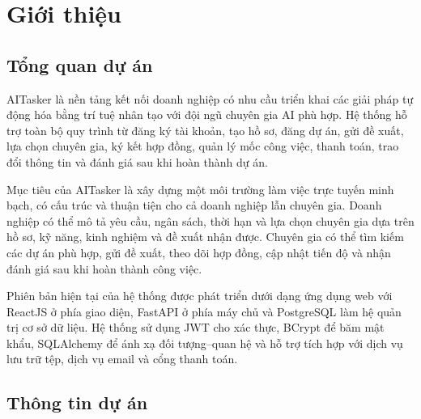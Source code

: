 
\chapter{Giới thiệu}
\label{chap:introduction}

\section{Tổng quan dự án}
\label{sec:project-overview}

AITasker là nền tảng kết nối doanh nghiệp có nhu cầu triển khai các giải pháp tự động hóa bằng trí tuệ nhân tạo với đội ngũ chuyên gia AI phù hợp. Hệ thống hỗ trợ toàn bộ quy trình từ đăng ký tài khoản, tạo hồ sơ, đăng dự án, gửi đề xuất, lựa chọn chuyên gia, ký kết hợp đồng, quản lý mốc công việc, thanh toán, trao đổi thông tin và đánh giá sau khi hoàn thành dự án.

Mục tiêu của AITasker là xây dựng một môi trường làm việc trực tuyến minh bạch, có cấu trúc và thuận tiện cho cả doanh nghiệp lẫn chuyên gia. Doanh nghiệp có thể mô tả yêu cầu, ngân sách, thời hạn và lựa chọn chuyên gia dựa trên hồ sơ, kỹ năng, kinh nghiệm và đề xuất nhận được. Chuyên gia có thể tìm kiếm các dự án phù hợp, gửi đề xuất, theo dõi hợp đồng, cập nhật tiến độ và nhận đánh giá sau khi hoàn thành công việc.

Phiên bản hiện tại của hệ thống được phát triển dưới dạng ứng dụng web với ReactJS ở phía giao diện, FastAPI ở phía máy chủ và PostgreSQL làm hệ quản trị cơ sở dữ liệu. Hệ thống sử dụng JWT cho xác thực, BCrypt để băm mật khẩu, SQLAlchemy để ánh xạ đối tượng--quan hệ và hỗ trợ tích hợp với dịch vụ lưu trữ tệp, dịch vụ email và cổng thanh toán.

\section{Thông tin dự án}
\label{sec:project-information}

